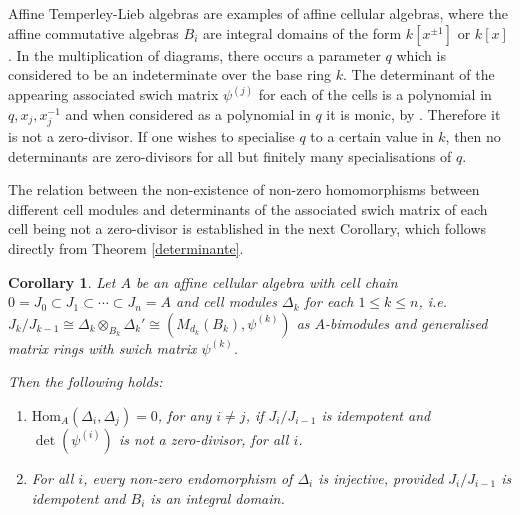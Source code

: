 \documentclass[oneside, a4paper, 11pt]{amsart}
\newtheorem{corollary}[theorem]{Corollary}
\newtheorem{proposition}[theorem]{Proposition}
\newcommand{\Hom}{\mathrm{Hom}}
\begin{document}
Affine Temperley-Lieb algebras are examples of affine cellular algebras, where the affine commutative algebras $B_i$ are integral domains of the form $k[x^{\pm 1}]$ or $k[x]$. In the multiplication of diagrams, there occurs a parameter $q$ which is considered to be an indeterminate over the base ring $k$. The determinant of the appearing associated swich matrix $\psi^{(j)}$ for each of the cells is a polynomial in $q, x_j, x_j^{-1}$ and when considered as a polynomial in $q$ it is
monic, by \cite[Lemma 5.9]{CKLS}. Therefore it is not a zero-divisor. If one wishes to specialise $q$ to a certain value in $k$, then no determinants are zero-divisors for all but finitely many specialisations of $q$.
\medskip

The relation between the non-existence of non-zero homomorphisms between  different cell modules and determinants of the associated swich matrix of each cell being not  a zero-divisor is established in the next Corollary, which follows directly from Theorem \ref{determinante}.

\begin{corollary}\label{regular}
Let $A$ be an affine cellular algebra with cell chain $0=J_0 \subset J_1 \subset \cdots \subset J_n=A$ and cell modules $\Delta_k$ for each $1\leq k\leq n$, i.e. 
$J_k/J_{k-1} \cong \Delta_k \otimes_{B_k}  \Delta_k' \cong \left( M_{d_k}(B_k), \psi^{(k)} \right)$ as $A$-bimodules and 
generalised matrix rings with swich matrix $\psi^{(k)}$.

Then the following holds:
\begin{enumerate}
    \item $\Hom_A(\Delta_i,\Delta_j)=0$, for any $i\neq j$, if $J_i/J_{i-1}$ is idempotent and $\det(\psi^{(i)})$ is not a zero-divisor, for all $i$.
    \item For all $i$, every non-zero endomorphism of $\Delta_i$ is injective,
      provided $J_i/J_{i-1}$ is idempotent  and $B_i$ is an integral domain. 
\end{enumerate}
\end{corollary}

\end{document}
